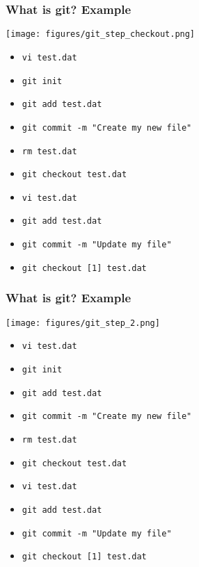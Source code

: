 \documentclass[xcolor=dvipsnames,10pt]{beamer}
\begin{document}
\addtocounter{framenumber}{-1}
\begin{frame}
 \frametitle{What is git? Example}
 
 \begin{center}
  \texttt{[image: figures/git\_step\_checkout.png]}
 \end{center}
 \vspace*{-0.5cm}
 
 \begin{itemize}
  \color{gray}
  \item[] \texttt{vi test.dat}
  \item[] \texttt{git init}
  \item[] \texttt{git add test.dat}
  \item[] \texttt{git commit -m "Create my new file"}
  \item[] \texttt{rm test.dat}
  \color{black}
  \item   \texttt{git checkout test.dat}
  \color{white}
  \item[] \texttt{vi test.dat}
  \item[] \texttt{git add test.dat}
  \item[] \texttt{git commit -m "Update my file"}
  \item[] \texttt{git checkout [1] test.dat}
 \end{itemize}

\end{frame}
\addtocounter{framenumber}{-1}
\begin{frame}
 \frametitle{What is git? Example}
 
 \begin{center}
  \texttt{[image: figures/git\_step\_2.png]}
 \end{center}
 \vspace*{-0.5cm}
 
 \begin{itemize}
  \color{gray}
  \item[] \texttt{vi test.dat}
  \item[] \texttt{git init}
  \item[] \texttt{git add test.dat}
  \item[] \texttt{git commit -m "Create my new file"}
  \item[] \texttt{rm test.dat}
  \item[] \texttt{git checkout test.dat}
  \color{black}
  \item   \texttt{vi test.dat}
  \color{white}
  \item[] \texttt{git add test.dat}
  \item[] \texttt{git commit -m "Update my file"}
  \item[] \texttt{git checkout [1] test.dat}
 \end{itemize}

\end{frame}
\end{document}
